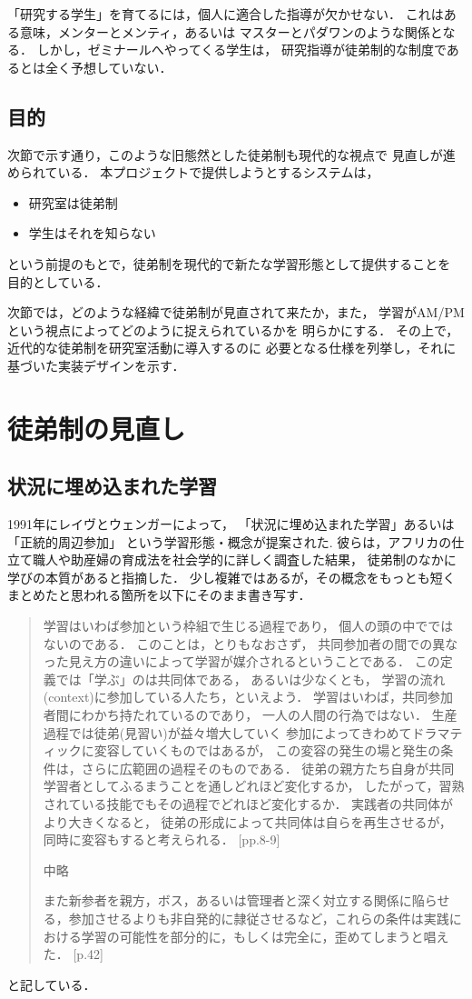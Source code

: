 \documentclass{hissymp}
\begin{document}
「研究する学生」を育てるには，個人に適合した指導が欠かせない．
これはある意味，メンターとメンティ，あるいは
マスターとパダワンのような関係となる．
しかし，ゼミナールへやってくる学生は，
研究指導が徒弟制的な制度であるとは全く予想していない．

\subsection{目的}
\label{sec:org3ed8058}
次節で示す通り，このような旧態然とした徒弟制も現代的な視点で
見直しが進められている．
本プロジェクトで提供しようとするシステムは，
\begin{itemize}
\item 研究室は徒弟制
\item 学生はそれを知らない
\end{itemize}
という前提のもとで，徒弟制を現代的で新たな学習形態として提供することを
目的としている．

次節では，どのような経緯で徒弟制が見直されて来たか，また，
学習がAM/PMという視点によってどのように捉えられているかを
明らかにする．
その上で，近代的な徒弟制を研究室活動に導入するのに
必要となる仕様を列挙し，それに基づいた実装デザインを示す．

\section{徒弟制の見直し}
\label{sec:orgb489577}
\subsection{状況に埋め込まれた学習}
\label{sec:org9133134}
1991年にレイヴとウェンガーによって，
  「状況に埋め込まれた学習」あるいは「正統的周辺参加」
  という学習形態・概念が提案された\cite{LaveWenger}.
  彼らは，アフリカの仕立て職人や助産婦の育成法を社会学的に詳しく調査した結果，
  徒弟制のなかに学びの本質があると指摘した．
少し複雑ではあるが，その概念をもっとも短くまとめたと思われる箇所を以下にそのまま書き写す．
\begin{quote}
学習はいわば参加という枠組で生じる過程であり，
個人の頭の中でではないのである．
このことは，とりもなおさず，
共同参加者の間での異なった見え方の違いによって学習が媒介されるということである．
この定義では「学ぶ」のは共同体である，
あるいは少なくとも，
学習の流れ(context)に参加している人たち，といえよう．
学習はいわば，共同参加者間にわかち持たれているのであり，
一人の人間の行為ではない．
生産過程では徒弟(見習い)が益々増大していく
参加によってきわめてドラマティックに変容していくものではあるが，
この変容の発生の場と発生の条件は，さらに広範囲の過程そのものである．
徒弟の親方たち自身が共同学習者としてふるまうことを通しどれほど変化するか，
したがって，習熟されている技能でもその過程でどれほど変化するか．
実践者の共同体がより大きくなると，
徒弟の形成によって共同体は自らを再生させるが，
同時に変容もすると考えられる．
\cite{LaveWenger}[pp.8-9]

中略

また新参者を親方，ボス，あるいは管理者と深く対立する関係に陥らせる，参加させるよりも非自発的に隷従させるなど，これらの条件は実践における学習の可能性を部分的に，もしくは完全に，歪めてしまうと唱えた．
\cite{LaveWenger}[p.42]
\end{quote}
と記している．
\end{document}

